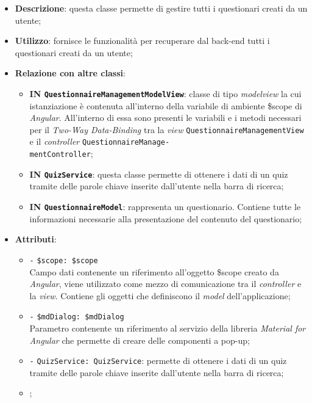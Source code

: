 \begin{itemize}
	\item \textbf{Descrizione}: questa classe permette di gestire tutti i questionari creati da un utente; 
	\item \textbf{Utilizzo}: fornisce le funzionalità per recuperare dal back-end tutti i questionari creati da un utente;
	\item \textbf{Relazione con altre classi}:
	\begin{itemize}
		\item \textbf{IN \texttt{QuestionnaireManagementModelView}}: classe di tipo \textit{modelview} la cui istanziazione è contenuta all'interno della variabile di ambiente \$scope di \textit{Angular}. All'interno di essa sono presenti le variabili e i metodi necessari per il \textit{Two-Way Data-Binding} tra la \textit{view} \texttt{QuestionnaireManagementView} e il \textit{controller} \texttt{QuestionnaireManage-\\mentController};
		\item \textbf{IN \texttt{QuizService}}: questa classe permette di ottenere i dati di un quiz tramite delle parole chiave inserite dall'utente nella barra di ricerca;
		\item \textbf{IN \texttt{QuestionnaireModel}}: rappresenta un questionario. Contiene tutte le informazioni necessarie alla presentazione del contenuto del questionario;
	\end{itemize}
	\item \textbf{Attributi}:
	\begin{itemize}
		\item \texttt{-} \texttt{\$scope: \$scope} \\
		Campo dati contenente un riferimento all'oggetto \$scope creato da \textit{Angular}, viene utilizzato come mezzo di comunicazione tra il \textit{controller} e la \textit{view}. Contiene gli oggetti che definiscono il \textit{model} dell'applicazione;
		\item \texttt{-} \texttt{\$mdDialog: \$mdDialog} \\
		Parametro contenente un riferimento al servizio della libreria \textit{Material for Angular} che permette di creare delle componenti a pop-up;
		\item \texttt{-}	 \texttt{QuizService: QuizService}: permette di ottenere i dati di un quiz tramite delle parole chiave inserite dall'utente nella barra di ricerca;
		\item \rootscopeA;

\end{itemize}
\end{itemize}
